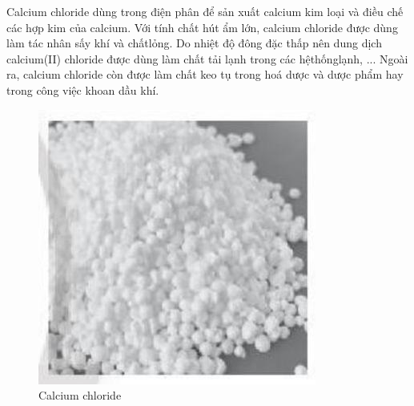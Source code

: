 \documentclass[10pt]{article}
\begin{document}
Calcium chloride dùng trong điện phân để sản xuất calcium kim loại và điều chế các hợp kim của calcium. Với tính chất hút ẩm lớn, calcium chloride được dùng làm tác nhân sấy khí và chấtlỏng. Do nhiệt độ đông đặc thấp nên dung dịch calcium(II) chloride được dùng làm chất tải lạnh trong các hệthốnglạnh, ... Ngoài ra, calcium chloride còn được làm chất keo tụ trong hoá dược và dược phẩm hay trong công việc khoan dầu khí.

\begin{figure}[h]
\begin{center}
  \includegraphics[width=\textwidth]{2025_10_23_883c4b146e2332109fcdg-39}
\captionsetup{labelformat=empty}
\caption{Calcium chloride}
\end{center}
\end{figure}
\end{document}
